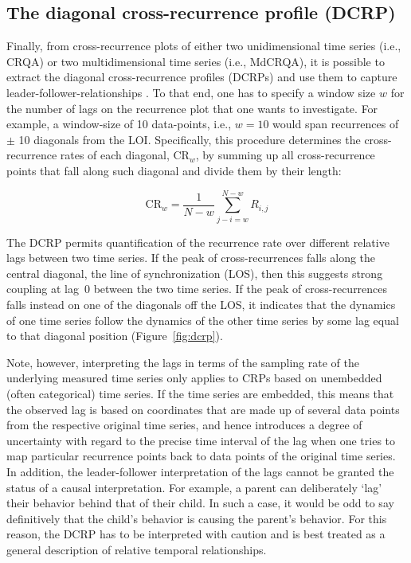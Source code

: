 \subsection{The diagonal cross-recurrence profile (DCRP)}
\label{sec:drp}

Finally, from cross-recurrence plots of either two unidimensional time series (i.e., CRQA) or two multidimensional time series (i.e., MdCRQA), it is possible to extract the diagonal cross-recurrence profiles (DCRPs) and use them to capture leader-follower-relationships \citep{dale2011nominal,marwan2007recurrence}. To that end, one has to specify a window size $w$ for the number of lags on the recurrence plot that one wants to investigate. For example, a window-size of 10 data-points, i.e., $w = 10$ would span recurrences of $\pm$ 10 diagonals from the LOI. Specifically, this procedure determines the cross-recurrence rates of each diagonal, $\mathrm{CR}_w$, by summing up all cross-recurrence points that fall along such diagonal and divide them by their length: 

\begin{equation}
    \mathrm{CR}_{w} = \frac{1}{N - w} \sum_{j-i=w}^{N-w} R_{i,j} 
\end{equation}

The DCRP permits quantification of the recurrence rate over different relative lags between two time series. If the peak of cross-recurrences falls along the central diagonal, the line of synchronization (LOS), then this suggests strong coupling at lag~0 between the two time series. If the peak of cross-recurrences falls instead on one of the diagonals off the LOS, it indicates that the dynamics of one time series follow the dynamics of the other time series by some lag equal to that diagonal position (Figure~\ref{fig:dcrp}). 

Note, however, interpreting the lags in terms of the sampling rate of the underlying measured time series only applies to CRPs based on unembedded (often categorical) time series. If the time series are embedded, this means that the observed lag is based on coordinates that are made up of several data points from the respective original time series, and hence introduces a degree of uncertainty with regard to the precise time interval of the lag when one tries to map particular recurrence points back to data points of the original time series. In addition, the leader-follower interpretation of the lags cannot be granted the status of a causal interpretation. For example, a parent can deliberately `lag' their behavior behind that of their child. In such a case, it would be odd to say definitively that the child's behavior is causing the parent's behavior. For this reason, the DCRP has to be interpreted with caution and is best treated as a general description of relative temporal relationships. 

